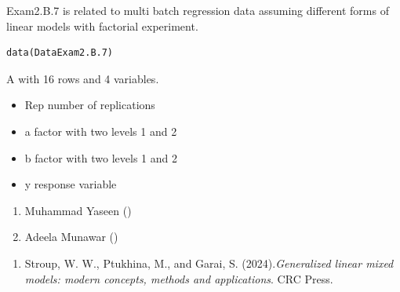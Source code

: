 \documentclass[a4paper]{book}
\begin{document}
%
\begin{Description}
Exam2.B.7 is related to multi batch regression data assuming different forms of linear models with factorial experiment.
\end{Description}
%
\begin{Usage}
\begin{verbatim}
data(DataExam2.B.7)
\end{verbatim}
\end{Usage}
%
\begin{Format}
A  with 16 rows and 4 variables.
\end{Format}
%
\begin{Details}
\begin{itemize}

\item{} Rep number of replications
\item{} a factor with two levels 1 and 2
\item{} b factor with two levels 1 and 2
\item{} y  response variable

\end{itemize}

\end{Details}
%
\begin{Author}
\begin{enumerate}

\item{}  Muhammad Yaseen ()
\item{} Adeela Munawar ()

\end{enumerate}

\end{Author}
%
\begin{References}
\begin{enumerate}

\item{} Stroup, W. W., Ptukhina, M., and Garai, S. (2024).\emph{Generalized linear mixed models: modern concepts, methods and applications}.
CRC Press.

\end{enumerate}

\end{References}
\end{document}

